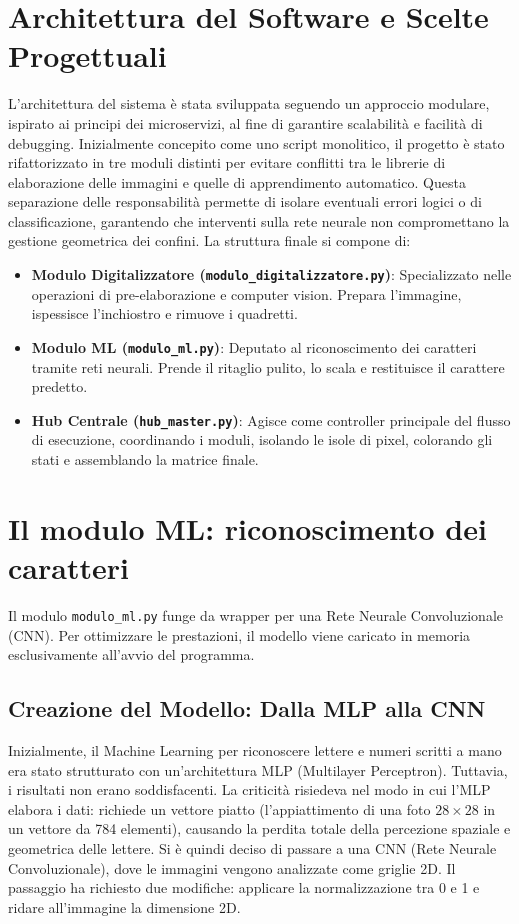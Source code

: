 \documentclass[12pt,a4paper]{article}
\begin{document}
	\section{Architettura del Software e Scelte Progettuali}
	L'architettura del sistema è stata sviluppata seguendo un approccio modulare, ispirato ai principi dei microservizi, al fine di garantire scalabilità e facilità di debugging. Inizialmente concepito come uno script monolitico, il progetto è stato rifattorizzato in tre moduli distinti per evitare conflitti tra le librerie di elaborazione delle immagini e quelle di apprendimento automatico. Questa separazione delle responsabilità permette di isolare eventuali errori logici o di classificazione, garantendo che interventi sulla rete neurale non compromettano la gestione geometrica dei confini.
	La struttura finale si compone di:
	\begin{itemize}
		\item \textbf{Modulo Digitalizzatore (\texttt{modulo\_digitalizzatore.py})}: Specializzato nelle operazioni di pre-elaborazione e computer vision. Prepara l'immagine, ispessisce l'inchiostro e rimuove i quadretti.
		\item \textbf{Modulo ML (\texttt{modulo\_ml.py})}: Deputato al riconoscimento dei caratteri tramite reti neurali. Prende il ritaglio pulito, lo scala e restituisce il carattere predetto.
		\item \textbf{Hub Centrale (\texttt{hub\_master.py})}: Agisce come controller principale del flusso di esecuzione, coordinando i moduli, isolando le isole di pixel, colorando gli stati e assemblando la matrice finale.
	\end{itemize}

	\section{Il modulo ML: riconoscimento dei caratteri}
	Il modulo \texttt{modulo\_ml.py} funge da wrapper per una Rete Neurale Convoluzionale (CNN). Per ottimizzare le prestazioni, il modello viene caricato in memoria esclusivamente all'avvio del programma.

	\subsection{Creazione del Modello: Dalla MLP alla CNN}
	Inizialmente, il Machine Learning per riconoscere lettere e numeri scritti a mano era stato strutturato con un'architettura MLP (Multilayer Perceptron). Tuttavia, i risultati non erano soddisfacenti. La criticità risiedeva nel modo in cui l'MLP elabora i dati: richiede un vettore piatto (l'appiattimento di una foto $28\times28$ in un vettore da 784 elementi), causando la perdita totale della percezione spaziale e geometrica delle lettere.
	Si è quindi deciso di passare a una CNN (Rete Neurale Convoluzionale), dove le immagini vengono analizzate come griglie 2D. Il passaggio ha richiesto due modifiche: applicare la normalizzazione tra 0 e 1 e ridare all'immagine la dimensione 2D.
\end{document}
